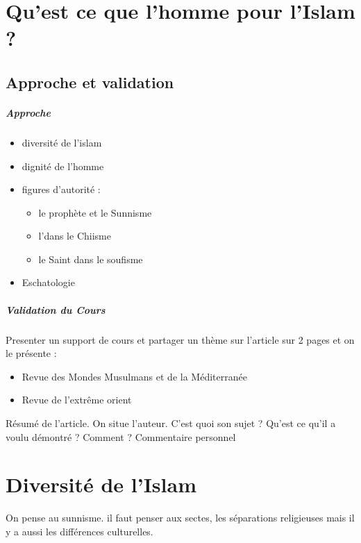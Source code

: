 \chapter{Qu'est ce que l'homme pour l'Islam ?}
\section{Approche et validation}

\paragraph{Approche}
\begin{itemize}
\item diversité de l'islam
\item dignité de l'homme
\item figures d'autorité : 
\begin{itemize}
\item le prophète et le Sunnisme
\item l'\Imam dans le Chiisme
\item le Saint dans le soufisme
\end{itemize}
\item Eschatologie
\end{itemize}

\paragraph{Validation du Cours}Presenter un support de cours et partager un thème sur l'article sur 2 pages et on le présente : 
\begin{itemize}
\item Revue des Mondes Musulmans et de la Méditerranée
\item Revue de l'extrême orient
\end{itemize}
Résumé de l'article. On situe l'auteur. C'est quoi son sujet ? Qu'est ce qu'il a voulu démontré ? Comment ? 
Commentaire personnel 


\chapter{Diversité de l'Islam}

On pense au sunnisme. il faut penser aux sectes, les séparations religieuses mais il y a aussi les différences culturelles.
